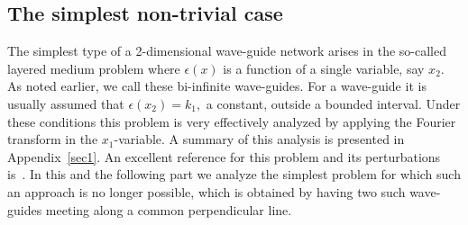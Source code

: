 \documentclass[11pt]{article}
\newcommand{\Bk}{\color{black}}
\newcommand{\Rd}{\color{black}}
\newcommand\cS{\mathcal{S}}
\newcommand\bbR{\mathbb R}
\newcommand\supp{\operatorname{supp}}
\theoremstyle{definition}
\theoremstyle{remark}
\begin{document}

\Bk
\subsection{The simplest non-trivial case}
The simplest type of a 2-dimensional wave-guide network arises in the so-called
layered medium problem where $\epsilon(x)$ is a function of a single variable,
say $x_2.$ As noted earlier, we call these bi-infinite wave-guides. \Rd For a
wave-guide it is usually assumed that $\epsilon(x_2)=k_1,$ a constant, outside a bounded
interval. \Bk Under these
conditions this problem is very effectively analyzed by applying the Fourier
transform in the $x_1$-variable. A summary of this analysis is presented in
Appendix~\ref{sec1}. An excellent reference for this problem and its
perturbations is~\cite{Christiansen}.  In this and the following part we analyze
the simplest problem for which such an approach is no longer possible, which is
obtained by having two such wave-guides meeting along a common perpendicular
line.
\end{document}
